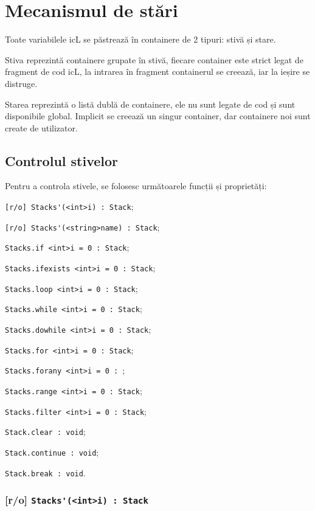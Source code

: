 \section{Mecanismul de stări}

Toate variabilele icL se păstrează în containere de 2 tipuri: stivă și stare.

Stiva reprezintă containere grupate în stivă, fiecare container este strict legat de fragment de cod icL, la intrarea în fragment containerul se creează, iar la ieșire se distruge.

Starea reprezintă o listă dublă de containere, ele nu sunt legate de cod și sunt disponibile global. Implicit se creează un singur container, dar containere noi sunt create de utilizator.

\subsection{Controlul stivelor}

Pentru a controla stivele, se folosesc următoarele funcții și proprietăți:
\begin{icItems}
	\item \lstinline|[r/o] Stacks'(<int>i) : Stack|;
	\item \lstinline|[r/o] Stacks'(<string>name) : Stack|;
	\item \lstinline|Stacks.if <int>i = 0 : Stack|;
	\item \lstinline|Stacks.ifexists <int>i = 0 : Stack|;
	\item \lstinline|Stacks.loop <int>i = 0 : Stack|;
	\item \lstinline|Stacks.while <int>i = 0 : Stack|;
	\item \lstinline|Stacks.dowhile <int>i = 0 : Stack|;
	\item \lstinline|Stacks.for <int>i = 0 : Stack|;
	\item \lstinline|Stacks.forany <int>i = 0 : |;
	\item \lstinline|Stacks.range <int>i = 0 : Stack|;
	\item \lstinline|Stacks.filter <int>i = 0 : Stack|;
	\item \lstinline|Stack.clear : void|;
	\item \lstinline|Stack.continue : void|;
	\item \lstinline|Stack.break : void|.
\end{icItems}

\subsubsection{[r/o] \lstinline|Stacks'(<int>i) : Stack|}

